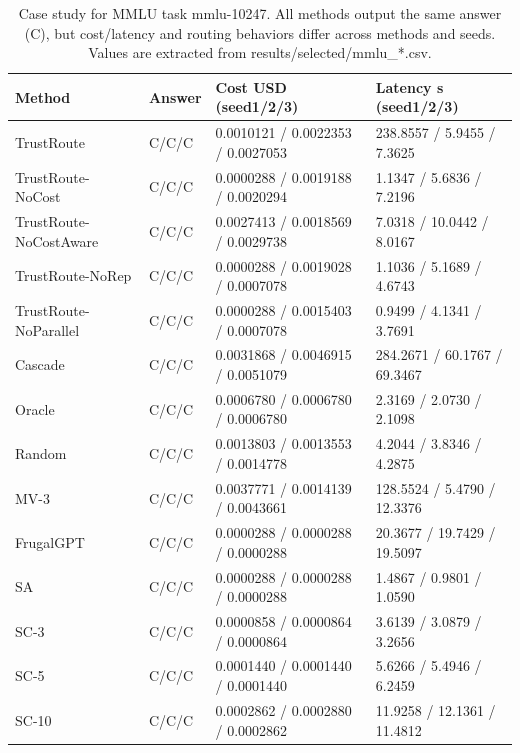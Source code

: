 \begin{table}[t]
\centering
\small
\setlength{\tabcolsep}{6pt}
\begin{tabular}{llp{4.2cm}p{6.6cm}}
\toprule
Method & Answer & Cost USD (seed1/2/3) & Latency s (seed1/2/3) \\
\midrule
TrustRoute & C/C/C & 0.0010121 / 0.0022353 / 0.0027053 & 238.8557 / 5.9455 / 7.3625 \\
TrustRoute-NoCost & C/C/C & 0.0000288 / 0.0019188 / 0.0020294 & 1.1347 / 5.6836 / 7.2196 \\
TrustRoute-NoCostAware & C/C/C & 0.0027413 / 0.0018569 / 0.0029738 & 7.0318 / 10.0442 / 8.0167 \\
TrustRoute-NoRep & C/C/C & 0.0000288 / 0.0019028 / 0.0007078 & 1.1036 / 5.1689 / 4.6743 \\
TrustRoute-NoParallel & C/C/C & 0.0000288 / 0.0015403 / 0.0007078 & 0.9499 / 4.1341 / 3.7691 \\
\midrule
Cascade & C/C/C & 0.0031868 / 0.0046915 / 0.0051079 & 284.2671 / 60.1767 / 69.3467 \\
Oracle & C/C/C & 0.0006780 / 0.0006780 / 0.0006780 & 2.3169 / 2.0730 / 2.1098 \\
Random & C/C/C & 0.0013803 / 0.0013553 / 0.0014778 & 4.2044 / 3.8346 / 4.2875 \\
MV-3 & C/C/C & 0.0037771 / 0.0014139 / 0.0043661 & 128.5524 / 5.4790 / 12.3376 \\
FrugalGPT & C/C/C & 0.0000288 / 0.0000288 / 0.0000288 & 20.3677 / 19.7429 / 19.5097 \\
SA & C/C/C & 0.0000288 / 0.0000288 / 0.0000288 & 1.4867 / 0.9801 / 1.0590 \\
SC-3 & C/C/C & 0.0000858 / 0.0000864 / 0.0000864 & 3.6139 / 3.0879 / 3.2656 \\
SC-5 & C/C/C & 0.0001440 / 0.0001440 / 0.0001440 & 5.6266 / 5.4946 / 6.2459 \\
SC-10 & C/C/C & 0.0002862 / 0.0002880 / 0.0002862 & 11.9258 / 12.1361 / 11.4812 \\
\bottomrule
\end{tabular}
\caption{Case study for MMLU task mmlu-10247. All methods output the same answer (C), but cost/latency and routing behaviors differ across methods and seeds. Values are extracted from results/selected/mmlu\_*.csv.}
\label{tab:case-mmlu-10247-compact}
\end{table}